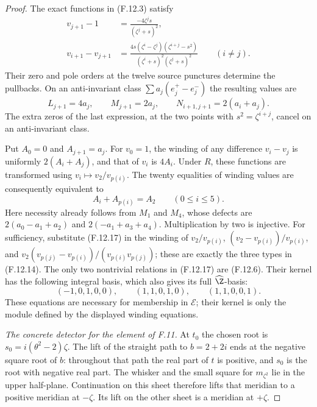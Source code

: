 \begin{proof}
The exact functions in (F.12.3) satisfy
\[
 \begin{split}
 v_{j+1}-1
     &=\frac{-4\zeta^j s}{(\zeta^j+s)^2},\\
 v_{i+1}-v_{j+1}
     &=\frac{4s(\zeta^i-\zeta^j)(\zeta^{i+j}-s^2)}
             {(\zeta^i+s)^2(\zeta^j+s)^2}
                         \qquad(i\ne j).
 \end{split}                                                   \tag{F.12.15}
\]
Their zero and pole orders at the twelve
source punctures determine the pullbacks.
On an anti-invariant class
$\sum a_j(e_j^+-e_j^-)$ the resulting values
are
\[
       L_{j+1}=4a_j,\qquad M_{j+1}=2a_j,\qquad
                   N_{i+1,j+1}=2(a_i+a_j).
                                                               \tag{F.12.16}
\]
The extra zeros of the last expression,
at the two points with $s^2=\zeta^{i+j}$,
cancel on an anti-invariant class.

Put $A_0=0$ and $A_{j+1}=a_j$.
For $v_0=1$, the winding of any difference
$v_i-v_j$ is uniformly $2(A_i+A_j)$,
and that of $v_i$ is $4A_i$.
Under $R$, these functions are transformed
using $v_i\mapsto v_2/v_{p(i)}$.
The twenty equalities of winding values
are consequently equivalent to
\[
                   A_i+A_{p(i)}=A_2
                             \qquad(0\leq i\leq5).            \tag{F.12.17}
\]
Here necessity already follows from
$M_1$ and $M_4$, whose defects are
$2(a_0-a_1+a_2)$ and
$2(-a_1+a_3+a_4)$.
Multiplication by two is injective.
For sufficiency, substitute (F.12.17)
in the winding of $v_2/v_{p(i)}$,
$(v_2-v_{p(i)})/v_{p(i)}$, and
$v_2(v_{p(j)}-v_{p(i)})/(v_{p(i)}v_{p(j)})$;
these are exactly the three types in
(F.12.14).
The only two nontrivial relations in
(F.12.17) are (F.12.6).
Their kernel has the following integral
basis, which also gives its full
$\widehat\Z$-basis:
\[
          (-1,0,1,0,0),\qquad
          (1,1,0,1,0),\qquad
          (1,1,0,0,1).
                                                               \tag{F.12.18}
\]
These equations are necessary for
membership in $\mathcal E$; their kernel
is only the module defined by the
displayed winding equations.

\emph{The concrete detector for the element of F.11.}
At $t_0$ the chosen root is
$s_0=i(\theta^2-2)\zeta$.
The lift of the straight path to $b=2+2i$
ends at the negative square root of $b$:
throughout that path the real part of
$t$ is positive, and $s_0$ is the root
with negative real part.
The whisker and the small square for
$m_{\zeta^2}$ lie in the upper half-plane.
Continuation on this sheet therefore
lifts that meridian to a positive
meridian at $-\zeta$.
Its lift on the other sheet is a meridian
at $+\zeta$.


\end{proof}
